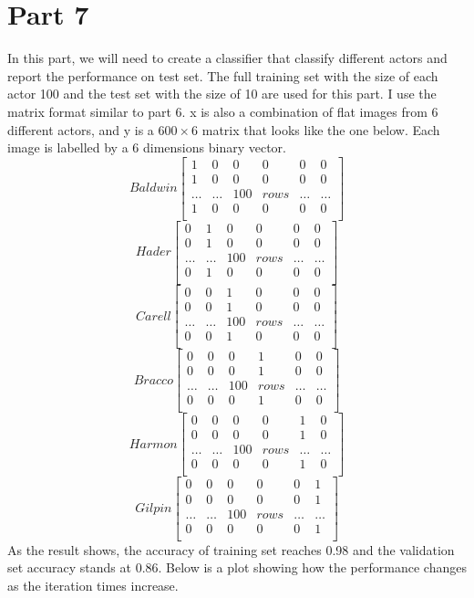 \documentclass{article}
\begin{document}
\section*{Part 7}
In this part, we will need to create a classifier that classify different actors and report the performance on test set. The full training set with the size of each actor 100 and the test set with the size of 10 are used for this part. I use the matrix format similar to part 6. x is also a combination of flat images from 6 different actors, and y is a $600\times6$ matrix that looks like the one below. Each image is labelled by a 6 dimensions binary vector.
\[
Baldwin 
\begin{bmatrix}
1 & 0 & 0 & 0  & 0 & 0 \\
1 & 0 & 0 & 0  & 0 & 0 \\
\dots & \dots & 100 & rows & \dots & \dots \\
1 & 0 & 0 & 0  & 0 & 0 \\ 
\end{bmatrix}
\]
\[
Hader 
\begin{bmatrix}
0 & 1 & 0 & 0  & 0 & 0 \\
0 & 1 & 0 & 0  & 0 & 0 \\
\dots & \dots & 100 & rows & \dots & \dots \\
0 & 1 & 0 & 0  & 0 & 0 \\ 
\end{bmatrix}
\]
\[
Carell 
\begin{bmatrix}
0 & 0 & 1 & 0  & 0 & 0 \\
0 & 0 & 1 & 0  & 0 & 0 \\
\dots & \dots & 100 & rows & \dots & \dots \\
0 & 0 & 1 & 0  & 0 & 0 \\ 
\end{bmatrix}
\]
\[
Bracco
\begin{bmatrix}
0 & 0 & 0 & 1  & 0 & 0 \\
0 & 0 & 0 & 1  & 0 & 0 \\
\dots & \dots & 100 & rows & \dots & \dots \\
0 & 0 & 0 & 1  & 0 & 0 \\ 
\end{bmatrix}
\]
\[
Harmon
\begin{bmatrix}
0 & 0 & 0 & 0  & 1 & 0 \\
0 & 0 & 0 & 0  & 1 & 0 \\
\dots & \dots & 100 & rows & \dots & \dots \\
0 & 0 & 0 & 0  & 1 & 0 \\ 
\end{bmatrix}
\]
\[
Gilpin
\begin{bmatrix}
0 & 0 & 0 & 0  & 0 & 1 \\
0 & 0 & 0 & 0  & 0 & 1 \\
\dots & \dots & 100 & rows & \dots & \dots \\
0 & 0 & 0 & 0  & 0 & 1 \\ 
\end{bmatrix}
\]
As the result shows, the accuracy of training set reaches 0.98 and the validation set accuracy stands at 0.86. Below is a plot showing how the performance changes as the iteration times increase.
\end{document}
